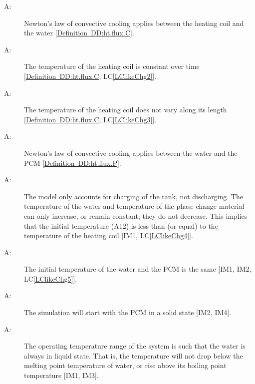 \documentclass[12pt]{article}
\newcounter{assumpnum}
\newcommand{\atheassumpnum}{A\theassumpnum}
\begin{document}
\begin{description}
\item[\atheassumpnum\label{Aassump7}:]Newton's law of convective cooling applies between the heating coil and the water [\hyperref[DD:ht.flux.C]{Definition~DD:ht.flux.C}].
\end{description}
\begin{description}
\item[\atheassumpnum\label{Aassump8}:]The temperature of the heating coil is constant over time [\hyperref[DD:ht.flux.C]{Definition~DD:ht.flux.C}, LC\ref{LClikeChg2}].
\end{description}
\begin{description}
\item[\atheassumpnum\label{Aassump9}:]The temperature of the heating coil does not vary along its length [\hyperref[DD:ht.flux.C]{Definition~DD:ht.flux.C}, LC\ref{LClikeChg3}].
\end{description}
\begin{description}
\item[\atheassumpnum\label{Aassump10}:]Newton's law of convective cooling applies between the water and the PCM [\hyperref[DD:ht.flux.P]{Definition~DD:ht.flux.P}].
\end{description}
\begin{description}
\item[\atheassumpnum\label{Aassump11}:]The model only accounts for charging of the tank, not discharging. The temperature of the water and temperature of the phase change material can only increase, or remain constant; they do not decrease. This implies that the initial temperature (A12) is less than (or equal) to the temperature of the heating coil [IM1, LC\ref{LClikeChg4}].
\end{description}
\begin{description}
\item[\atheassumpnum\label{Aassump12}:]The initial temperature of the water and the PCM is the same [IM1, IM2, LC\ref{LClikeChg5}].
\end{description}
\begin{description}
\item[\atheassumpnum\label{Aassump13}:]The simulation will start with the PCM in a solid state [IM2, IM4].
\end{description}
\begin{description}
\item[\atheassumpnum\label{Aassump14}:]The operating temperature range of the system is such that the water is always in liquid state. That is, the temperature will not drop below the melting point temperature of water, or rise above its boiling point temperature [IM1, IM3].
\end{description}
\end{document}
